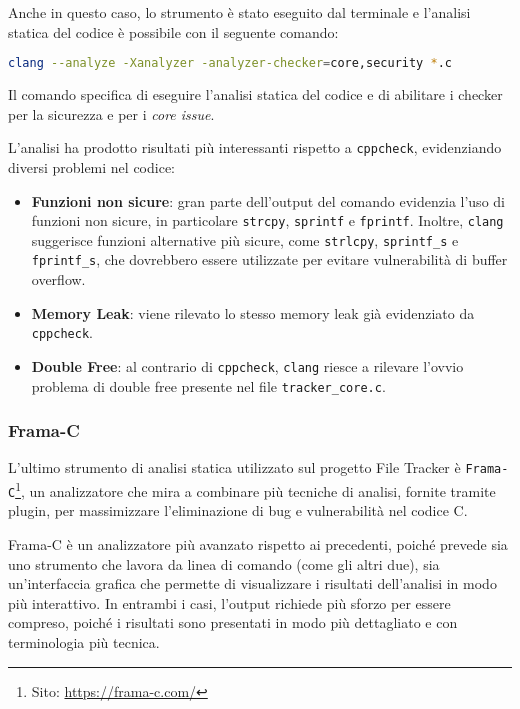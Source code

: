 Anche in questo caso, lo strumento è stato eseguito dal terminale e l'analisi
statica del codice è possibile con il seguente comando: \begin{lstlisting}[language=bash, numbers=none]
clang --analyze -Xanalyzer -analyzer-checker=core,security *.c
\end{lstlisting}
Il comando specifica di eseguire l'analisi statica del codice e di abilitare i checker
per la sicurezza e per i \textit{core issue}.

L'analisi ha prodotto risultati più interessanti rispetto a \texttt{cppcheck},
evidenziando diversi problemi nel codice:
\begin{itemize}
  \item \textbf{Funzioni non sicure}: gran parte dell'output del comando evidenzia
    l'uso di funzioni non sicure, in particolare \texttt{strcpy}, \texttt{sprintf}
    e \texttt{fprintf}. Inoltre, \texttt{clang} suggerisce funzioni alternative più
    sicure, come \texttt{strlcpy}, \texttt{sprintf\_s} e \texttt{fprintf\_s}, che
    dovrebbero essere utilizzate per evitare vulnerabilità di buffer overflow.

  \item \textbf{Memory Leak}: viene rilevato lo stesso memory leak già evidenziato
    da \texttt{cppcheck}.

  \item \textbf{Double Free}: al contrario di \texttt{cppcheck}, \texttt{clang}
    riesce a rilevare l'ovvio problema di double free presente nel file \texttt{tracker\_core.c}.
\end{itemize}

\subsubsection*{Frama-C}
L'ultimo strumento di analisi statica utilizzato sul progetto File Tracker è
\texttt{Frama-C}\footnote{Sito: \url{https://frama-c.com/}}, un analizzatore che
mira a combinare più tecniche di analisi, fornite tramite plugin, per massimizzare
l'eliminazione di bug e vulnerabilità nel codice C.

Frama-C è un analizzatore più avanzato rispetto ai precedenti, poiché prevede
sia uno strumento che lavora da linea di comando (come gli altri due), sia un'interfaccia
grafica che permette di visualizzare i risultati dell'analisi in modo più interattivo.
In entrambi i casi, l'output richiede più sforzo per essere compreso, poiché i
risultati sono presentati in modo più dettagliato e con terminologia più tecnica.

